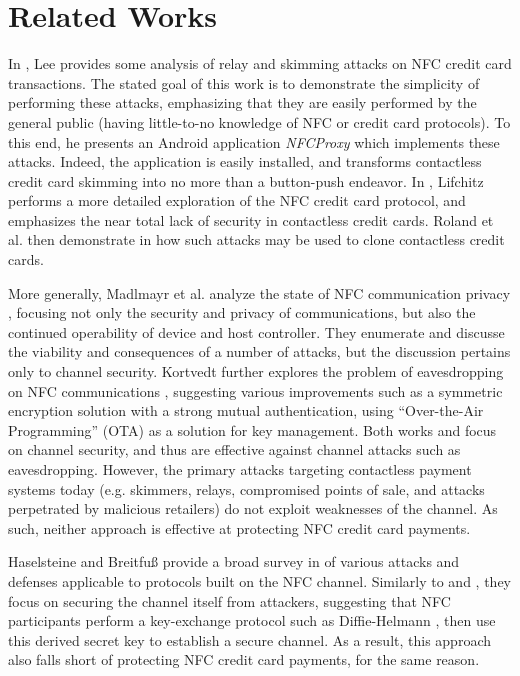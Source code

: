 \section{Related Works}
\label{sec:related}

In \cite{lee2012nfc}, Lee provides some analysis of relay and skimming attacks on NFC credit card transactions.
The stated goal of this work is to demonstrate the simplicity of performing these attacks,
    emphasizing that they are easily performed by the general public (having little-to-no knowledge of NFC or credit card protocols).
To this end, he presents an Android application \emph{NFCProxy} \cite{NFCProxy} which implements these attacks.
Indeed, the application is easily installed, and transforms contactless credit card skimming into no more than a button-push endeavor.
In \cite{lifchitz2012hacking}, Lifchitz performs a more detailed exploration of the NFC credit card protocol, and emphasizes the near total lack of security in contactless credit cards.
Roland et al. then demonstrate in \cite{roland2013cloning} how such attacks may be used to clone contactless credit cards.

More generally, Madlmayr et al. analyze the state of NFC communication privacy \cite{madlmayr2008nfc},
    focusing not only the security and privacy of communications, but also the continued operability of device and host controller.
They enumerate and discusse the viability and consequences of a number of attacks, but the discussion pertains only to channel security.
Kortvedt further explores the problem of eavesdropping on NFC communications \cite{kortvedt2009securing},
    suggesting various improvements such as a symmetric encryption solution with a strong mutual authentication,
    using ``Over-the-Air Programming'' (OTA) as a solution for key management.
Both works \cite{kortvedt2009securing} and \cite{madlmayr2008nfc} focus on channel security, and thus are effective against channel attacks such as eavesdropping.
However, the primary attacks targeting contactless payment systems today
    (e.g. skimmers, relays, compromised points of sale, and attacks perpetrated by malicious retailers) do not exploit weaknesses of the channel.
As such, neither approach is effective at protecting NFC credit card payments.

Haselsteine and Breitfu{\ss} provide a broad survey in \cite{haselsteiner2006security} of various attacks and defenses applicable to protocols built on the NFC channel.
Similarly to \cite{madlmayr2008nfc} and \cite{kortvedt2009securing}, they focus on securing the channel itself from attackers,
    suggesting that NFC participants perform a key-exchange protocol such as Diffie-Helmann \cite{diffiehellman},
    then use this derived secret key to establish a secure channel.
As a result, this approach also falls short of protecting NFC credit card payments, for the same reason.

